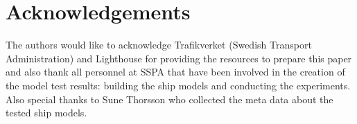 \section*{Acknowledgements}
\label{se:acknowledgements}
The authors would like to acknowledge Trafikverket (Swedish Transport Administration) and Lighthouse for providing the resources to prepare this paper and also thank all personnel at SSPA that have been involved in the creation of the model test results: building the ship models and conducting the experiments. Also special thanks to Sune Thorsson who collected the meta data about the tested ship models.




